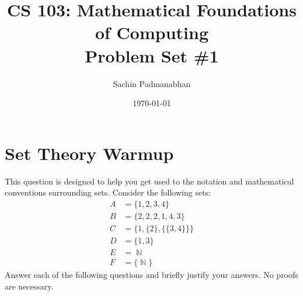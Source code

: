 \documentclass{article}
\title{CS 103: Mathematical Foundations of Computing\\Problem Set \#1}
\author{Sachin Padmanabhan}
\date{\today}
\renewcommand{\(}{\left(}
\renewcommand{\)}{\right)}
\DeclareMathOperator{\N}{\mathbb{N}}
\theoremstyle{plain}
\theoremstyle{plain}
\theoremstyle{definition}
\begin{document}
\maketitle

\section{Set Theory Warmup}

This question is designed to help you get used to the notation and mathematical
conventions surrounding sets.
Consider the following sets:
\begin{align*}
A &= \{1, 2, 3, 4\} \\
B &= \{2, 2, 2, 1, 4, 3\} \\
C &= \{1, \{2\}, \{\{3, 4\}\}\} \\
D &= \{1, 3\} \\
E &= \N \\
F &= \{\N\}
\end{align*}
Answer each of the following questions and briefly justify your answers.
No proofs are necessary.
\end{document}
